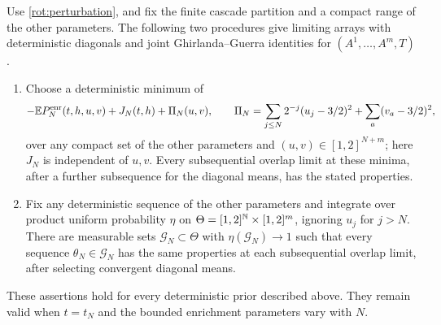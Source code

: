 \begin{proposition}\label{rot:gg}
Use \eqref{rot:perturbation}, and fix the finite cascade partition and
a compact range of the other parameters.  The following two
procedures give limiting arrays with deterministic diagonals and
joint Ghirlanda--Guerra identities for \((A^1,\ldots,A^m,T)\).
\begin{enumerate}
\item Choose a deterministic minimum of
\[
 -\mathbb E P_N^{\mathrm{enr}}(t,h,u,v)+J_N(t,h)
       +\Pi_N(u,v),
 \qquad
 \Pi_N=\sum_{j\le N}2^{-j}(u_j-3/2)^2
             +\sum_a(v_a-3/2)^2,
\]
over any compact set of the other parameters and
\((u,v)\in[1,2]^{N+m}\); here \(J_N\) is independent of \(u,v\).
Every subsequential overlap limit at these minima, after a further
subsequence for the diagonal means, has the stated properties.
\item Fix any deterministic sequence of the other parameters and
integrate over product uniform probability \(\eta\) on
\(\Theta=[1,2]^{\mathbb N}\times[1,2]^m\), ignoring \(u_j\) for \(j>N\).
There are measurable sets \(\mathcal G_N\subset\Theta\) with
\(\eta(\mathcal G_N)\to1\) such that every sequence
\(\theta_N\in\mathcal G_N\) has the same properties at each
subsequential overlap limit, after selecting convergent diagonal
means.
\end{enumerate}
These assertions hold for every deterministic prior described above.
They remain valid when \(t=t_N\) and the bounded enrichment parameters
vary with \(N\).
\end{proposition}

